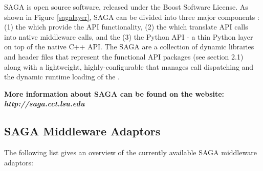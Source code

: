     SAGA is open source software, released under the Boost Software
    License. As shown in Figure \ref{sagalayer}, SAGA can be divided
    into three major components : (1) the  which
    provide the API functionality, (2) the  which translate
    API calls into native middleware calls, and the (3) the Python API
     - a thin Python layer on top of the native C++
    API. The SAGA  are a collection of dynamic
    libraries and header files that represent the functional API
    packages (see section 2.1) along with a lightweight,
    highly-configurable  that manages call dispatching and
    the dynamic runtime loading of the .

    \textbf{More information about SAGA can be found on the
    website: \\ \textit{http://saga.cct.lsu.edu}}

\pagebreak
\subsection{SAGA Middleware Adaptors}

    The following list gives an overview of the currently available SAGA
    middleware adaptors:
    
